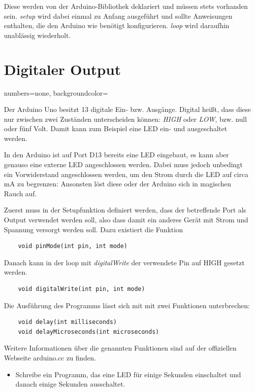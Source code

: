 \documentclass[10pt,a4paper]{article}
\begin{document}
Diese werden von der Arduino-Bibliothek deklariert und müssen stets vorhanden sein. \emph{setup} wird dabei einmal zu Anfang ausgeführt und sollte Anweisungen enthalten, die den Arduino wie benötigt konfigurieren.
\emph{loop} wird daraufhin unablässig wiederholt.


\clearpage
\section{Digitaler Output}
\lstset
{
	numbers=none,
	backgroundcolor=\color[gray]{0.85}
}

Der Arduino Uno besitzt 13 digitale Ein- bzw. Ausgänge. Digital heißt, dass diese nur zwischen zwei Zuständen unterscheiden können: \emph{HIGH} oder \emph{LOW}, bzw. null oder fünf Volt. Damit kann zum Beispiel eine LED ein- und ausgeschaltet werden.

In den Arduino ist auf Port D13 bereits eine LED eingebaut, es kann aber genauso eine externe LED angeschlossen werden. Dabei muss jedoch unbedingt ein Vorwiderstand angeschlossen werden, um den Strom durch die LED auf circa \unit[20]{mA} zu begrenzen: Ansonsten löst diese oder der Arduino sich in magischen Rauch auf.
\bigskip

Zuerst muss in der Setupfunktion definiert werden, dass der betreffende Port als Output verwendet werden soll, also dass damit ein anderes Gerät mit Strom und Spannung versorgt werden soll. Dazu existiert die Funktion
\begin{lstlisting}
	void pinMode(int pin, int mode)
\end{lstlisting}
\bigskip

Danach kann in der loop mit \emph{digitalWrite} der verwendete Pin auf HIGH gesetzt werden.
\begin{lstlisting}
	void digitalWrite(int pin, int mode)
\end{lstlisting}
\bigskip

Die Ausführung des Programms lässt sich mit mit zwei Funktionen unterbrechen:
\begin{lstlisting}
	void delay(int milliseconds)
	void delayMicroseconds(int microseconds)
\end{lstlisting}
\bigskip

Weitere Informationen über die genannten Funktionen sind auf der offiziellen Webseite arduino.cc zu finden.
\begin{itemize}
	\item Schreibe ein Programm, das eine LED für einige Sekunden einschaltet und danach einige Sekunden ausschaltet.
\end{itemize}
\end{document}
